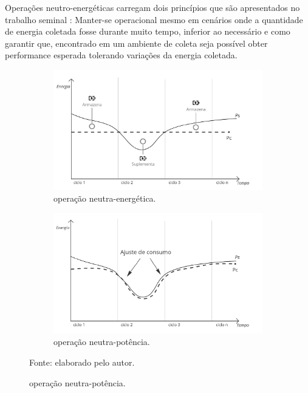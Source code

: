 Operações neutro-energéticas carregam dois princípios que são apresentados no trabalho seminal \cite{kansal_power_2007}: Manter-se operacional mesmo em cenários onde a quantidade de energia coletada fosse durante muito tempo, inferior ao necessário e como garantir que, encontrado em um ambiente de coleta seja possível obter performance esperada tolerando variações da energia coletada. 

\begin{figure}[H]
	\centering
	\caption{Dinâmicas de operação com coleta de energia} \label{fig:dinamicas}
	\begin{subfigure}{0.49\textwidth}
		\caption{operação neutra-energética.}
		\label{fig:cap2energyneutraloperation}
		\includegraphics[width=\linewidth]{Imagens/cap2/cap2energyneutraloperation.jpg}	
	\end{subfigure}%
	\hspace*{\fill}  
	\begin{subfigure}{0.49\textwidth}
		\caption{operação neutra-potência.}
		\label{fig:cap2powerneutraloperation}
		\includegraphics[width=\linewidth]{Imagens/cap2/cap2powerneutraloperation.jpg}
	\end{subfigure}%
	\hspace*{\fill}   
	
	Fonte: elaborado pelo autor.
\end{figure}


